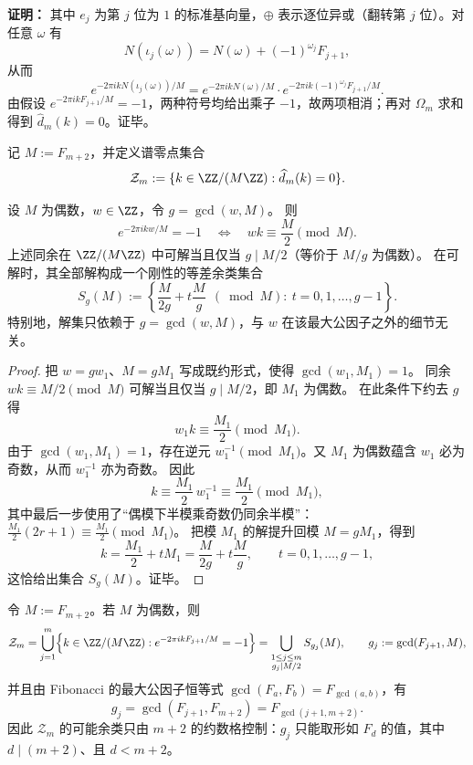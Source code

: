 \textbf{证明：}
其中 $e_j$ 为第 $j$ 位为 $1$ 的标准基向量，$\oplus$ 表示逐位异或（翻转第 $j$ 位）。对任意 $\omega$ 有
\[
N(\iota_j(\omega))=N(\omega)+(-1)^{\omega_j}F_{j+1},
\]
从而
\[
e^{-2\pi i k N(\iota_j(\omega))/M}
=e^{-2\pi i k N(\omega)/M}\cdot e^{-2\pi i k(-1)^{\omega_j}F_{j+1}/M}.
\]
由假设 $e^{-2\pi i k F_{j+1}/M}=-1$，两种符号均给出乘子 $-1$，故两项相消；再对 $\Omega_m$ 求和得到 $\widehat d_m(k)=0$。证毕。

\begin{definition}[谱零点集合]\label{def:fold-spectrum-zero-set}
记 \(M:=F_{m+2}\)，并定义谱零点集合
\[
\mathcal{Z}_m:=\{k\in\ZZ/(M\ZZ):\widehat d_m(k)=0\}.
\]
\end{definition}

\begin{theorem}\label{thm:fold-zero-coset-rigidity}
设 \(M\) 为偶数，\(w\in\ZZ\)，令 \(g=\gcd(w,M)\)。
则
\[
e^{-2\pi i k w/M}=-1
\quad\Longleftrightarrow\quad
wk\equiv \frac{M}{2}\pmod M.
\]
上述同余在 \(\ZZ/(M\ZZ)\) 中可解当且仅当 \(g\mid M/2\)（等价于 \(M/g\) 为偶数）。
在可解时，其全部解构成一个刚性的等差余类集合
\[
S_g(M):=\left\{\frac{M}{2g}+t\frac{M}{g}\ \ (\bmod M):\ t=0,1,\dots,g-1\right\}.
\]
特别地，解集只依赖于 \(g=\gcd(w,M)\)，与 \(w\) 在该最大公因子之外的细节无关。
\end{theorem}

\begin{proof}
把 \(w=gw_1\)、\(M=gM_1\) 写成既约形式，使得 \(\gcd(w_1,M_1)=1\)。
同余 \(wk\equiv M/2\pmod M\) 可解当且仅当 \(g\mid M/2\)，即 \(M_1\) 为偶数。
在此条件下约去 \(g\) 得
\[
w_1k\equiv \frac{M_1}{2}\pmod{M_1}.
\]
由于 \(\gcd(w_1,M_1)=1\)，存在逆元 \(w_1^{-1}\pmod{M_1}\)。又 \(M_1\) 为偶数蕴含 \(w_1\) 必为奇数，从而 \(w_1^{-1}\) 亦为奇数。
因此
\[
k\equiv \frac{M_1}{2}\,w_1^{-1}\equiv \frac{M_1}{2}\pmod{M_1},
\]
其中最后一步使用了“偶模下半模乘奇数仍同余半模”：\(\frac{M_1}{2}(2r+1)\equiv \frac{M_1}{2}\pmod{M_1}\)。
把模 \(M_1\) 的解提升回模 \(M=gM_1\)，得到
\[
k=\frac{M_1}{2}+tM_1=\frac{M}{2g}+t\frac{M}{g},\qquad t=0,1,\dots,g-1,
\]
这恰给出集合 \(S_g(M)\)。证毕。
\end{proof}

\begin{corollary}\label{cor:fold-zero-coset-union}
令 \(M:=F_{m+2}\)。若 \(M\) 为偶数，则
\[
\mathcal{Z}_m=\bigcup_{j=1}^{m}\Bigl\{k\in\ZZ/(M\ZZ):e^{-2\pi i kF_{j+1}/M}=-1\Bigr\}
=\bigcup_{\substack{1\le j\le m\\ g_j\mid M/2}} S_{g_j}(M),
\qquad g_j:=\gcd(F_{j+1},M),
\]
并且由 Fibonacci 的最大公因子恒等式 \(\gcd(F_a,F_b)=F_{\gcd(a,b)}\)，有
\[
g_j=\gcd(F_{j+1},F_{m+2})=F_{\gcd(j+1,m+2)}.
\]
因此 \(\mathcal{Z}_m\) 的可能余类只由 \(m+2\) 的约数格控制：\(g_j\) 只能取形如 \(F_d\) 的值，其中 \(d\mid(m+2)\)、且 \(d<m+2\)。
\end{corollary}


